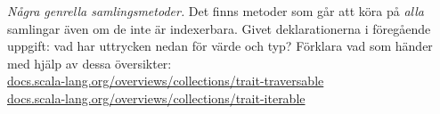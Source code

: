 \Subtask {}

\Subtask {}

\Subtask {}

\Subtask {}

\Subtask {}

\Subtask {}

\Subtask {}

\Subtask {}

\Subtask {}

\Subtask {}

\Subtask {}

\Subtask {}

\Subtask {}

\Subtask {}

\Subtask {}

\Subtask {}

\Subtask {}




\Task \emph{Några genrella samlingsmetoder.} Det finns metoder som går att köra på \emph{alla} samlingar även om de inte är indexerbara. Givet deklarationerna i föregående uppgift: vad har uttrycken nedan för värde och typ? Förklara vad som händer med hjälp av dessa översikter: \\ \href{http://docs.scala-lang.org/overviews/collections/trait-traversable}{docs.scala-lang.org/overviews/collections/trait-traversable} \\ \href{http://docs.scala-lang.org/overviews/collections/trait-iterable}{docs.scala-lang.org/overviews/collections/trait-iterable}

\Subtask {}

\Subtask {}

\Subtask {}

\Subtask \code{}

\Subtask \code{}

\Subtask \code{}

\Subtask \code{}

\Subtask \code{}	

\Subtask \code{}

\Subtask \code{}

\Subtask \code{}

